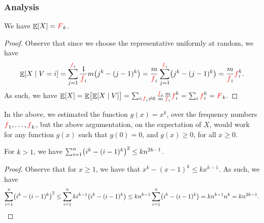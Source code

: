 
\subsubsection{Analysis}




\begin{lemma}
    We have $\mathop{\mathbb{E}}\!\left[ {X} \right]={\textcolor{red}{F}}_k$.
\end{lemma}
\begin{proof}
    Observe that since we choose the representative uniformly at
    random, we have
    \begin{equation*}
        \ExCond{X}{V=i}
        =%
        \sum_{j=1}^{\frq_i}\frac{1}{\frq_i} m \bigl( j^k - (j-1)^k \bigr)
        =%
        \frac{m}{\frq_i}\sum_{j=1}^{\frq_i}
        \bigl( j^k - (j-1)^k \bigr)
        =%
        \frac{m}{\frq_i} \frq_i^{k}.
    \end{equation*}
    As such, we have
    \begin{math}
        \Ex{X}%
        =%
        \Ex{\bigl.\ExCond{X}{V}} %
        =%
        \sum_{i: \frq_i\neq 0} \frac{\frq_i}{m} \frac{m}{\frq_i}
        \frq_i^{k} %
        =%
        \sum_{i} \frq_i^{k} %
        =%
        \Frq_k.
    \end{math}
\end{proof}



\begin{remark}
    In the above, we estimated the function $g(x)=x^k$, over the
    frequency numbers ${\textcolor{red}{f}}_1, \ldots, {\textcolor{red}{f}}_k$, but the above
    argumentation, on the expectation of $X$, would work for any
    function $g(x)$ such that $g(0)=0$, and $g(x) \geq 0$, for all
    $x \geq 0$.
\end{remark}


\begin{lemma}
    For $k > 1$, we have
    $\sum_{i=1}^n \pth{ i^k - (i-1)^k}^2 \leq kn^{2k-1}$.
\end{lemma}
\begin{proof}
    Observe that for $x\geq 1$, we have that
    $x^k - (x-1)^k \leq kx^{k-1}$. As such, we have
    \begin{equation*}
        \sum_{i=1}^n \pth{ i^k - (i-1)^k}^2%
        \leq %
        \sum_{i=1}^n  ki^{k-1}\pth{ i^k - (i-1)^k}%
        \leq %
        kn^{k-1} \sum_{i=1}^n \pth{ i^k - (i-1)^k}%
        =%
        kn^{k-1} n^{k}
        =%
        kn^{2k-1}.
    \end{equation*}
\end{proof}

